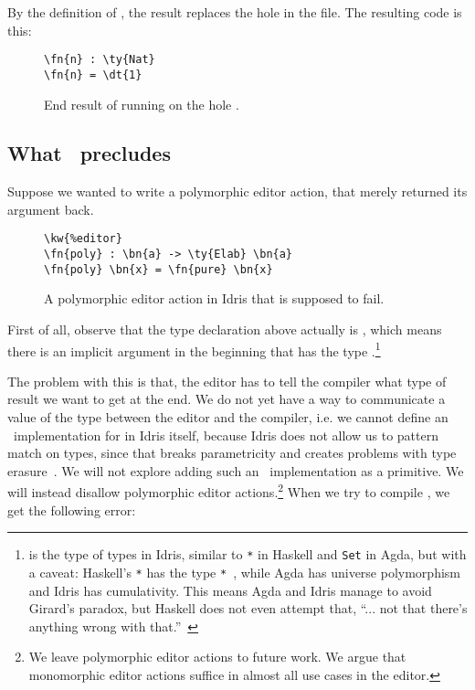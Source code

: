 By the definition of , the result  replaces the hole
 in the file. The resulting code is this:

\begin{figure}[ht]
\caption{End result of running  on the hole .}
\begin{Verbatim}[framesep=2mm, label=\footnotesize{\normalfont{Idris}}, labelposition=topline]
\fn{n} : \ty{Nat}
\fn{n} = \dt{1}
\end{Verbatim}
\end{figure}


\subsection{What \Editorable\ precludes}\label{ssec:preclude}

Suppose we wanted to write a polymorphic editor action, that merely returned its argument back.

\begin{figure}[ht]
  \caption{A polymorphic editor action  in Idris that is supposed to fail.}
\begin{Verbatim}[framesep=2mm, label=\footnotesize{\normalfont{Idris}}, labelposition=topline]
\kw{%editor}
\fn{poly} : \bn{a} -> \ty{Elab} \bn{a}
\fn{poly} \bn{x} = \fn{pure} \bn{x}
\end{Verbatim}
\end{figure}

First of all, observe that the type declaration above actually is
, which means
there is an implicit argument in the beginning that has the type
.\footnote{ is the type of types in Idris, similar to
\texttt{*} in Haskell and \texttt{Set} in Agda, but with a caveat:
Haskell's \texttt{*} has the type \texttt{*}~\cite{eisenberg}, while Agda has universe
polymorphism and Idris has cumulativity. This means Agda and Idris manage to
avoid Girard's paradox, but Haskell does not even attempt that, ``... not that
there's anything wrong with that.''~\cite{outing}}

The problem with this is that, the editor has to tell the compiler what type of
result we want to get at the end. We do not yet have a way to communicate a
value of the type  between the editor and the compiler, i.e. we cannot
define an \Editorable\ implementation for  in Idris itself, because
Idris does not allow us to pattern match on types, since that breaks
parametricity and creates problems with type erasure~\cite{universePat}.
We will not explore adding such an \Editorable\ implementation as a primitive.
We will instead disallow polymorphic editor actions.\footnote{We leave
polymorphic editor actions to future work. We argue that monomorphic editor
actions suffice in almost all use cases in the editor.}
When we try to compile , we get the following error:


